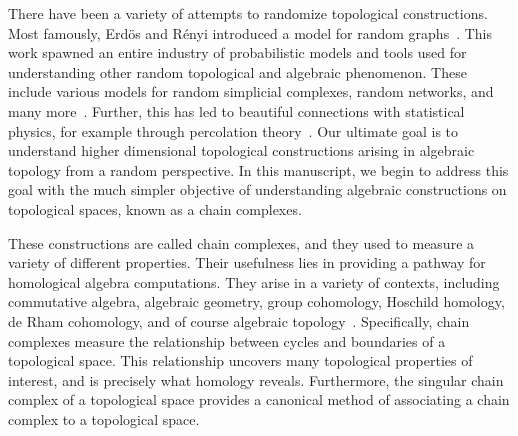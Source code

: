 There have been a variety of attempts to randomize topological constructions.
Most famously, Erd\"os and R\'enyi introduced a model for random
graphs~\cite{erdos_random_1959}.  This work spawned an
entire industry of probabilistic models and tools used for understanding other
random topological and algebraic phenomenon. These include various models for
random simplicial complexes, random networks, and many
more~\cite{erdos_evolution_1960, linial_random_2017}. Further, this has
led to beautiful connections with statistical physics, for example through
percolation theory~\cite{bollobas_2006_percolation, broadbent_percolation_1957,
kesten_percolation_1982}.  Our ultimate goal is to understand higher
dimensional topological constructions arising in algebraic topology from a
random perspective. In this manuscript, we begin to address this goal with the
much simpler objective of understanding algebraic constructions on
topological spaces, known as a chain complexes. 

These constructions are called chain complexes, and they used to measure a variety of
different properties. Their usefulness lies in providing a pathway for
homological algebra computations. They arise in a variety of contexts,
including commutative algebra, algebraic geometry, group cohomology, Hoschild homology, de Rham
cohomology, and of course algebraic topology~\cite{bott2013differential, brown2012cohomology, hartshorne2013algebraic, hatcher2002algebraic, hochschild1945cohomology}. 
Specifically, chain
complexes measure the relationship between cycles and boundaries of a
topological space. This relationship uncovers many topological properties of
interest, and is precisely what homology reveals. Furthermore,
the singular chain complex of a topological space provides a canonical method
of associating a chain complex to a topological space.


%


